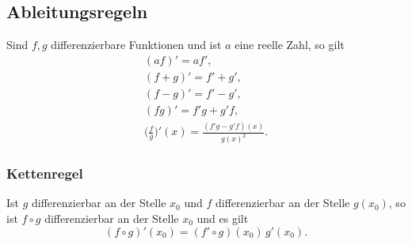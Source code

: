 \subsection{Ableitungsregeln}
Sind $f,g$ differenzierbare Funktionen und ist $a$ eine reelle Zahl,
so gilt
\begin{gather}
(af)' = af',\\
(f+g)' = f'+g',\\
(f-g)' = f'-g',\\
(fg)' = f'g+g'f,\\
\Big(\frac{f}{g}\Big)'(x) = \frac{(f'g-g'f)(x)}{g(x)^2}.
\end{gather}
\subsubsection{Kettenregel}
Ist $g$ differenzierbar an der Stelle $x_0$ und
$f$ differenzierbar an der Stelle $g(x_0)$, so ist $f\circ g$
differenzierbar an der Stelle $x_0$ und es gilt
\begin{equation}
(f\circ g)'(x_0) = (f'\circ g)(x_0)\, g'(x_0).
\end{equation}


